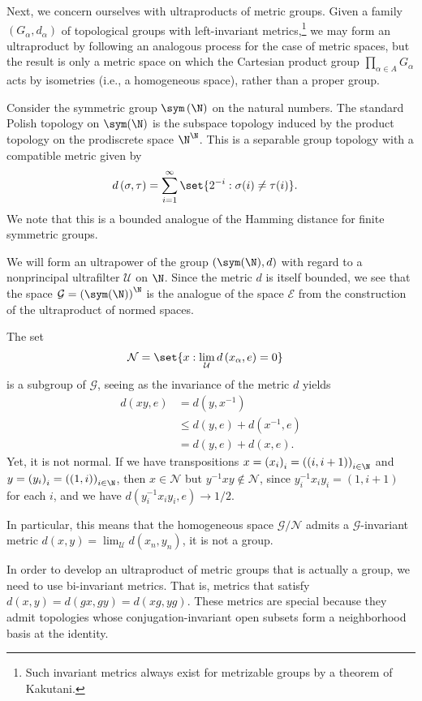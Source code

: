 \documentclass[10pt]{mypackage}
\begin{document}
Next, we concern ourselves with ultraproducts of metric groups. Given a family $\left( G_{\alpha},d_{\alpha} \right)$ of topological groups with left-invariant metrics,\footnote{Such invariant metrics always exist for metrizable groups by a theorem of Kakutani.} we may form an ultraproduct by following an analogous process for the case of metric spaces, but the result is only a metric space on which the Cartesian product group $\prod_{\alpha\in A}G_{\alpha}$ acts by isometries (i.e., a homogeneous space), rather than a proper group.
\begin{example}
  Consider the symmetric group $\sym\left(\N\right)$ on the natural numbers. The standard Polish topology on $\sym(\N)$ is the subspace topology induced by the product topology on the prodiscrete space $\N^{\N}$. This is a separable group topology with a compatible metric given by
  \begin{align*}
    d\left( \sigma,\tau \right) &= \sum_{i=1}^{\infty} \set{2^{-i} : \sigma(i)\neq \tau(i)}.
  \end{align*}
  We note that this is a bounded analogue of the Hamming distance for finite symmetric groups.

  We will form an ultrapower of the group $\left( \sym(\N),d \right)$ with regard to a nonprincipal ultrafilter $ \mathcal{U} $ on $\N$. Since the metric $d$ is itself bounded, we see that the space $\mathcal{G} = \left( \sym(\N) \right)^{\N}$ is the analogue of the space $\mathcal{E}$ from the construction of the ultraproduct of normed spaces.

  The set
  \begin{align*}
    \mathcal{N} &= \set{x : \lim_{\mathcal{U}}d\left( x_{\alpha},e \right) = 0}
  \end{align*}
  is a subgroup of $ \mathcal{G} $, seeing as the invariance of the metric $d$ yields
  \begin{align*}
    d\left( xy, e\right) &= d\left( y,x^{-1} \right)\\
                         &\leq d\left( y,e \right) + d\left( x^{-1},e \right)\\
                         &= d\left( y,e \right) + d\left( x,e \right).
  \end{align*}
  Yet, it is not normal. If we have transpositions $x = \left( x_i \right)_{i} = \left( \left( i,i+1 \right) \right)_{i\in \N}$ and $y = \left( y_i \right)_{i} = \left( \left( 1,i \right) \right)_{i\in \N}$, then $x\in \mathcal{N}$ but $y^{-1}xy\notin \mathcal{N}$, since $y_i^{-1}x_iy_i = \left( 1,i+1 \right)$ for each $i$, and we have $d\left( y_i^{-1}x_iy_i,e \right) \rightarrow 1/2$.

  In particular, this means that the homogeneous space $ \mathcal{G}/\mathcal{N} $ admits a $\mathcal{G}$-invariant metric $d\left( x,y \right) = \lim_{\mathcal{U}}d\left( x_n,y_n \right)$, it is not a group.
\end{example}
In order to develop an ultraproduct of metric groups that is actually a group, we need to use bi-invariant metrics. That is, metrics that satisfy $d\left( x,y \right) = d\left( gx,gy \right) = d\left( xg,yg \right)$. These metrics are special because they admit topologies whose conjugation-invariant open subsets form a neighborhood basis at the identity.
\end{document}
